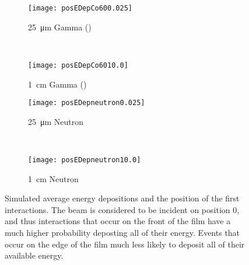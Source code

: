 \begin{figure*}[ht]
	\centering
	\begin{subfigure}[b]{0.45\textwidth}
    		\texttt{[image: posEDepCo600.025]}
		\caption{ \SI{25}{\um} Gamma ()}
	\end{subfigure}%
	~
	\begin{subfigure}[b]{0.45\textwidth}
    		\texttt{[image: posEDepCo6010.0]}
		  \caption{ \SI{1}{\cm} Gamma ()}
	\end{subfigure}%
	
  \begin{subfigure}[b]{0.45\textwidth}
    		\texttt{[image: posEDepneutron0.025]}
		\caption{ \SI{25}{\um} Neutron}
	\end{subfigure}%
	~
	\begin{subfigure}[b]{0.45\textwidth}
    		\texttt{[image: posEDepneutron10.0]}
		  \caption{ \SI{1}{\cm} Neutron}
	\end{subfigure}%
	\caption[Simulated Energy Deposition and Position]{Simulated average energy depositions and the position of the first interactions. The beam is considered to be incident on position 0, and thus interactions that occur on the front of the film have a much higher probability deposting all of their energy. Events that occur on the edge of the film much less likely to deposit all of their available energy.}
	\label{fig:EDepPosSim}
\end{figure*}


